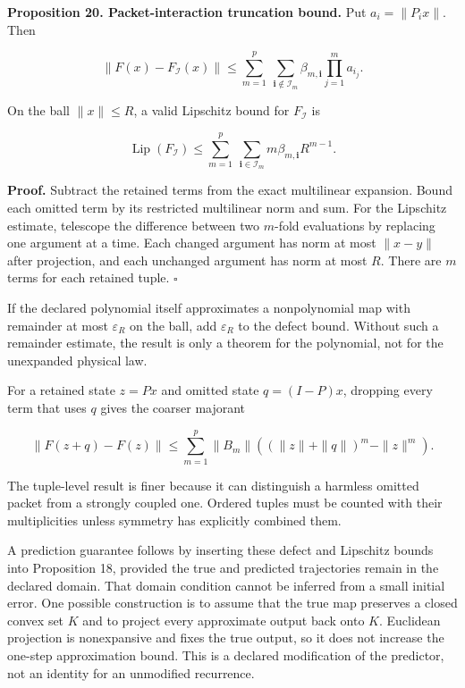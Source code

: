 \documentclass[11pt,letterpaper]{article}
\begin{document}
\textbf{Proposition 20. Packet-interaction truncation bound.} Put
\(a_i=\|P_ix\|\). Then

\[
\boxed{
\|F(x)-F_{\mathcal I}(x)\|
\leq\sum_{m=1}^{p}\ \sum_{\boldsymbol i\notin\mathcal I_m}
\beta_{m,\boldsymbol i}\prod_{j=1}^{m}a_{i_j}.
}
\]

On the ball \(\|x\|\leq R\), a valid Lipschitz bound for
\(F_{\mathcal I}\) is

\[
\operatorname{Lip}(F_{\mathcal I})
\leq\sum_{m=1}^{p}\ \sum_{\boldsymbol i\in\mathcal I_m}
m\beta_{m,\boldsymbol i}R^{m-1}.
\]

\textbf{Proof.} Subtract the retained terms from the exact multilinear
expansion. Bound each omitted term by its restricted multilinear norm
and sum. For the Lipschitz estimate, telescope the difference between
two \(m\)-fold evaluations by replacing one argument at a time. Each
changed argument has norm at most \(\|x-y\|\) after projection, and each
unchanged argument has norm at most \(R\). There are \(m\) terms for
each retained tuple. \(\square\)

If the declared polynomial itself approximates a nonpolynomial map with
remainder at most \(\varepsilon_R\) on the ball, add \(\varepsilon_R\)
to the defect bound. Without such a remainder estimate, the result is
only a theorem for the polynomial, not for the unexpanded physical law.

For a retained state \(z=Px\) and omitted state \(q=(I-P)x\), dropping
every term that uses \(q\) gives the coarser majorant

\[
\|F(z+q)-F(z)\|
\leq\sum_{m=1}^{p}\|B_m\|
\left((\|z\|+\|q\|)^m-\|z\|^m\right).
\]

The tuple-level result is finer because it can distinguish a harmless
omitted packet from a strongly coupled one. Ordered tuples must be
counted with their multiplicities unless symmetry has explicitly
combined them.

A prediction guarantee follows by inserting these defect and Lipschitz
bounds into Proposition 18, provided the true and predicted trajectories
remain in the declared domain. That domain condition cannot be inferred
from a small initial error. One possible construction is to assume that
the true map preserves a closed convex set \(K\) and to project every
approximate output back onto \(K\). Euclidean projection is nonexpansive
and fixes the true output, so it does not increase the one-step
approximation bound. This is a declared modification of the predictor,
not an identity for an unmodified recurrence.
\end{document}
